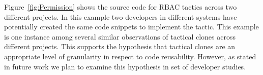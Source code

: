  Figure~\ref{fig:Permission} shows the source code for RBAC tactics across two different projects. In this example two developers in different systems have potentially created the same code snippets to implement the tactic. This example is one instance among several similar observations of tactical clones across different projects. This supports the hypothesis that tactical clones are an appropriate level of granularity in respect to code reusability. However, as stated in future work we plan to examine this hypothesis in set of developer studies.





